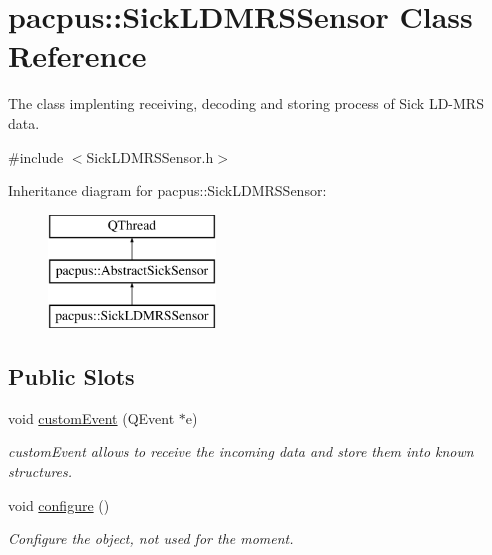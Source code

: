 \hypertarget{classpacpus_1_1SickLDMRSSensor}{\section{pacpus\-:\-:Sick\-L\-D\-M\-R\-S\-Sensor Class Reference}
\label{classpacpus_1_1SickLDMRSSensor}
}


The class implenting receiving, decoding and storing process of Sick L\-D-\/\-M\-R\-S data.  




{\ttfamily \#include $<$Sick\-L\-D\-M\-R\-S\-Sensor.\-h$>$}

Inheritance diagram for pacpus\-:\-:Sick\-L\-D\-M\-R\-S\-Sensor\-:\begin{figure}[H]
\begin{center}
\leavevmode
\includegraphics[height=3.000000cm]{classpacpus_1_1SickLDMRSSensor}
\end{center}
\end{figure}
\subsection*{Public Slots}
\begin{DoxyCompactItemize}
\item 
void \hyperlink{classpacpus_1_1SickLDMRSSensor_aff9f78d73af6aaf021cfbe9a521c6fad}{custom\-Event} (Q\-Event $\ast$e)
\begin{DoxyCompactList}\small\item\em custom\-Event allows to receive the incoming data and store them into known structures. \end{DoxyCompactList}\item 
\hypertarget{classpacpus_1_1SickLDMRSSensor_af88f26756d94460914ab88fb81f13768}{void \hyperlink{classpacpus_1_1SickLDMRSSensor_af88f26756d94460914ab88fb81f13768}{configure} ()}\label{classpacpus_1_1SickLDMRSSensor_af88f26756d94460914ab88fb81f13768}

\begin{DoxyCompactList}\small\item\em Configure the object, not used for the moment. \end{DoxyCompactList}\end{DoxyCompactItemize}
